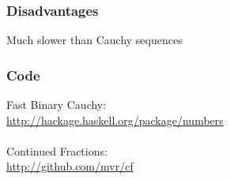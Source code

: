 \documentclass[11pt,aspectratio=169]{beamer}
\begin{document}
\begin{frame}
\frametitle{Disadvantages}
Much slower than Cauchy sequences
\end{frame}

\begin{frame}
\frametitle{Code}
Fast Binary Cauchy: \\ \url{http://hackage.haskell.org/package/numbers}
\\~\\
Continued Fractions: \\ \url{http://github.com/mvr/cf}
\end{frame}

\begin{frame}
\nocite{*}
\printbibliography
\end{frame}
\end{document}
